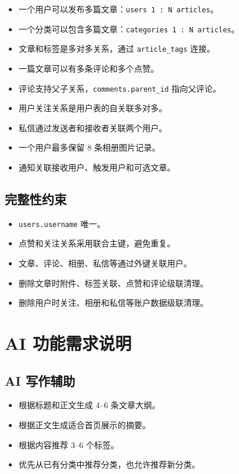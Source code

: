 \documentclass[UTF8,a4paper,12pt]{ctexart}
\begin{document}
\begin{itemize}
  \item 一个用户可以发布多篇文章：\texttt{users 1 : N articles}。
  \item 一个分类可以包含多篇文章：\texttt{categories 1 : N articles}。
  \item 文章和标签是多对多关系，通过 \texttt{article\_tags} 连接。
  \item 一篇文章可以有多条评论和多个点赞。
  \item 评论支持父子关系，\texttt{comments.parent\_id} 指向父评论。
  \item 用户关注关系是用户表的自关联多对多。
  \item 私信通过发送者和接收者关联两个用户。
  \item 一个用户最多保留 8 条相册图片记录。
  \item 通知关联接收用户、触发用户和可选文章。
\end{itemize}

\subsection{完整性约束}

\begin{itemize}
  \item \texttt{users.username} 唯一。
  \item 点赞和关注关系采用联合主键，避免重复。
  \item 文章、评论、相册、私信等通过外键关联用户。
  \item 删除文章时附件、标签关联、点赞和评论级联清理。
  \item 删除用户时关注、相册和私信等账户数据级联清理。
\end{itemize}

\section{AI 功能需求说明}

\subsection{AI 写作辅助}

\begin{itemize}
  \item 根据标题和正文生成 4--6 条文章大纲。
  \item 根据正文生成适合首页展示的摘要。
  \item 根据内容推荐 3--6 个标签。
  \item 优先从已有分类中推荐分类，也允许推荐新分类。
\end{itemize}
\end{document}
